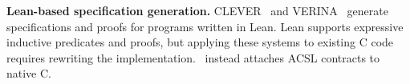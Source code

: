 \smallskip
\noindent\textbf{Lean-based specification generation.}
CLEVER~\cite{thakur2025clever} and VERINA~\cite{ye2026verina} generate specifications and proofs for programs written in Lean. Lean supports expressive inductive predicates and proofs, but applying these systems to existing C code requires rewriting the implementation. \toolname\ instead attaches ACSL contracts to native C.

\smallskip
{}

